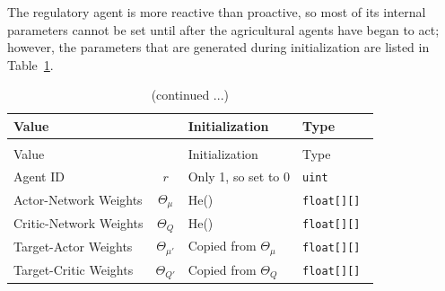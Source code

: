 The regulatory agent is more reactive than proactive,
so most of its internal parameters cannot be set until after
the agricultural agents have began to act;
however, the parameters that are generated during initialization are
listed in Table~\ref{tab:regulator_init}.

\begin{longtable}{lcll}
    \caption[Table listing initialization of parameters of
    the regulatory agent in the farm model]
    {Initialization of Regulatory Agent}
    \label{tab:regulator_init}
    \\
    \hline\hline
    Value & & Initialization & Type \\
    \hline
    \endfirsthead
    \caption[]{(continued ...)}\\ \hline\hline
    Value & & Initialization & Type\\ \hline
    \endhead
    \hline
    \endfoot
    Agent ID & $r$ & Only 1, so set to 0 & \tt{uint} \\
    Actor-Network Weights & $\Theta_\mu$ & He() & \tt{float[][]} \\
    Critic-Network Weights & $\Theta_Q$ & He() & \tt{float[][]} \\
    Target-Actor Weights & $\Theta_{\mu'}$ 
        & Copied from $\Theta_\mu$ & \tt{float[][]} \\
    Target-Critic Weights & $\Theta_{Q'}$ 
        & Copied from $\Theta_Q$ & \tt{float[][]} \\
\end{longtable}
